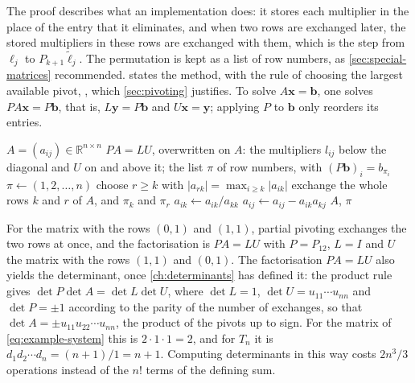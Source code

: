 The proof describes what an implementation does: it stores each multiplier in the place of the entry that it eliminates, and when two rows are exchanged later, the stored multipliers in these rows are exchanged with them, which is the step from $\boldsymbol\ell_j$ to $P_{k+1}\tilde{\boldsymbol\ell}_j$. The permutation is kept as a list of row numbers, as \cref{sec:special-matrices} recommended.  states the method, with the rule of choosing the largest available pivot, , which \cref{sec:pivoting} justifies. To solve $A\mathbf x=\mathbf b$, one solves $PA\mathbf x=P\mathbf b$, that is, $L\mathbf y=P\mathbf b$ and $U\mathbf x=\mathbf y$; applying $P$ to $\mathbf b$ only reorders its entries.

\begin{algorithm}
\begin{algorithmic}[1]
\Require $A=(a_{ij})\in\mathbb R^{n\times n}$
\Ensure $PA=LU$, overwritten on $A$: the multipliers $l_{ij}$ below the diagonal and $U$ on and above it; the list $\pi$ of row numbers, with $(P\mathbf b)_i=b_{\pi_i}$
\State $\pi\gets(1,2,\ldots,n)$
  \State choose $r\ge k$ with $|a_{rk}|=\max_{i\ge k}|a_{ik}|$
  \State exchange the whole rows $k$ and $r$ of $A$, and $\pi_k$ and $\pi_r$
   
      \State $a_{ik}\gets a_{ik}/a_{kk}$ 
        \State $a_{ij}\gets a_{ij}-a_{ik}a_{kj}$
      \EndFor
    \EndFor
  \EndIf
\EndFor
\State \Return $A$, $\pi$
\end{algorithmic}
\caption{LU factorisation with partial pivoting (\cref{thm:plu}). Exchanging whole rows also exchanges the multipliers already stored in them. The arithmetic is that of \cref{prop:elimination-cost}, about $2n^3/3$ operations, and the search for the pivots adds about $n^2/2$ comparisons.}
\label{alg:lu}
\end{algorithm}

For the matrix with the rows $(0,1)$ and $(1,1)$, partial pivoting exchanges the two rows at once, and the factorisation is $PA=LU$ with $P=P_{12}$, $L=I$ and $U$ the matrix with the rows $(1,1)$ and $(0,1)$. The factorisation $PA=LU$ also yields the determinant, once \cref{ch:determinants} has defined it: the product rule gives $\det P\det A=\det L\det U$, where $\det L=1$, $\det U=u_{11}\cdots u_{nn}$ and $\det P=\pm1$ according to the parity of the number of exchanges, so that $\det A=\pm u_{11}u_{22}\cdots u_{nn}$, the product of the pivots up to sign. For the matrix of \eqref{eq:example-system} this is $2\cdot1\cdot1=2$, and for $T_n$ it is $d_1d_2\cdots d_n=(n+1)/1=n+1$. Computing determinants in this way costs $2n^3/3$ operations instead of the $n!$ terms of the defining sum.

